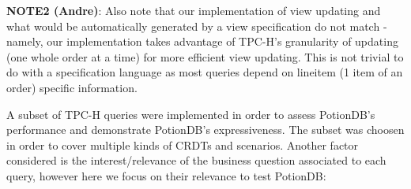 \documentclass[sigplan,10pt]{acmart}
\begin{document}
\textbf{NOTE2 (Andre)}: Also note that our implementation of view updating and what would be automatically generated by a view specification do not match - namely, our implementation takes advantage of TPC-H's granularity of updating (one whole order at a time) for more efficient view updating. This is not trivial to do with a specification language as most queries depend on lineitem (1 item of an order) specific information.

A subset of TPC-H queries were implemented in order to assess PotionDB's performance and demonstrate PotionDB's expressiveness.
The subset was choosen in order to cover multiple kinds of CRDTs and scenarios.
Another factor considered is the interest/relevance of the business question associated to each query, however here we focus on their relevance to test PotionDB:
\end{document}
